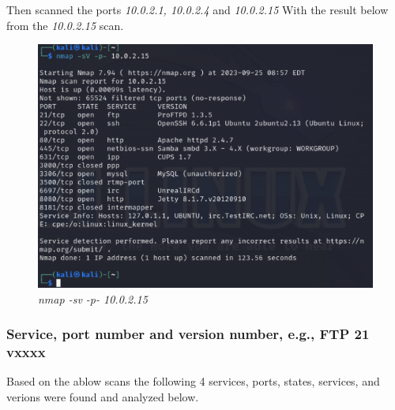 Then scanned the ports \textit{10.0.2.1, 10.0.2.4} and \textit{10.0.2.15}
With the result below from the \textit{10.0.2.15} scan.

\begin{figure}[H]
    \centering
    \includegraphics[width=0.7\linewidth]{pic/nmap sv.png}
    \caption{\textit{nmap -sv -p- 10.0.2.15}}
    \label{fig:nmap sv}
\end{figure}

\subsubsection{Service, port number and version number, e.g., FTP 21 vxxxx}
Based on the ablow scans the following 4 services, ports, states, services, and verions were found and analyzed below.

